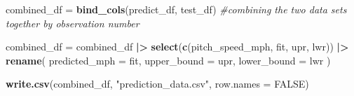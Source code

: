 \documentclass[
]{article}
\newenvironment{Shaded}{\begin{snugshade}}{\end{snugshade}}
\newcommand{\AttributeTok}[1]{\textcolor[rgb]{0.13,0.29,0.53}{#1}}
\newcommand{\CommentTok}[1]{\textcolor[rgb]{0.56,0.35,0.01}{\textit{#1}}}
\newcommand{\ConstantTok}[1]{\textcolor[rgb]{0.56,0.35,0.01}{#1}}
\newcommand{\FunctionTok}[1]{\textcolor[rgb]{0.13,0.29,0.53}{\textbf{#1}}}
\newcommand{\NormalTok}[1]{#1}
\newcommand{\OtherTok}[1]{\textcolor[rgb]{0.56,0.35,0.01}{#1}}
\newcommand{\SpecialCharTok}[1]{\textcolor[rgb]{0.81,0.36,0.00}{\textbf{#1}}}
\newcommand{\StringTok}[1]{\textcolor[rgb]{0.31,0.60,0.02}{#1}}
\begin{document}
\begin{Shaded}
\begin{Highlighting}[]
\NormalTok{combined\_df }\OtherTok{=} \FunctionTok{bind\_cols}\NormalTok{(predict\_df, test\_df) }\CommentTok{\#combining the two data sets together by observation number}

\NormalTok{combined\_df }\OtherTok{=}\NormalTok{ combined\_df }\SpecialCharTok{|\textgreater{}}
  \FunctionTok{select}\NormalTok{(}\FunctionTok{c}\NormalTok{(pitch\_speed\_mph, fit, upr, lwr)) }\SpecialCharTok{|\textgreater{}}
  \FunctionTok{rename}\NormalTok{(}
    \AttributeTok{predicted\_mph =}\NormalTok{ fit,}
    \AttributeTok{upper\_bound =}\NormalTok{ upr,}
    \AttributeTok{lower\_bound =}\NormalTok{ lwr}
\NormalTok{  )}

\FunctionTok{write.csv}\NormalTok{(combined\_df, }\StringTok{"prediction\_data.csv"}\NormalTok{, }\AttributeTok{row.names =} \ConstantTok{FALSE}\NormalTok{)}
\end{Highlighting}
\end{Shaded}
\end{document}
